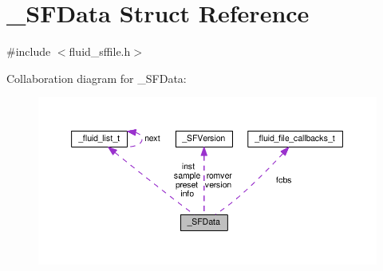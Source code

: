 \hypertarget{struct__SFData}{}\section{\+\_\+\+S\+F\+Data Struct Reference}
\label{struct__SFData}


{\ttfamily \#include $<$fluid\+\_\+sffile.\+h$>$}



Collaboration diagram for \+\_\+\+S\+F\+Data\+:
\nopagebreak
\begin{figure}[H]
\begin{center}
\leavevmode
\includegraphics[width=350pt]{struct__SFData__coll__graph}
\end{center}
\end{figure}
